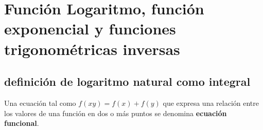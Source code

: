 \chapter{Función Logaritmo, función exponencial y funciones trigonométricas inversas}

\setcounter{section}{1}
\section{definición de logaritmo natural como integral}

Una ecuación tal como $f(xy)=f(x)+f(y)$ que expresa una relación entre los valores de una función en dos o más puntos se denomina \textbf{ecuación funcional}. 
